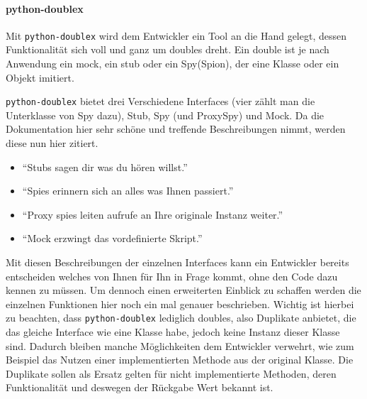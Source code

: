 \paragraph{python-doublex}\label{python-tools:doublex}\mbox{}
\newline
Mit \lstinline{python-doublex} wird dem Entwickler ein Tool an die Hand gelegt,
dessen Funktionalität sich voll und ganz um doubles dreht. Ein double ist je nach
Anwendung ein \Gls{mock}, ein \Gls{stub} oder ein Spy(Spion), der eine Klasse oder
ein Objekt imitiert.

\lstinline{python-doublex} bietet drei Verschiedene Interfaces (vier zählt man die
Unterklasse von Spy dazu), Stub, Spy (und ProxySpy) und Mock. Da die Dokumentation
hier sehr schöne und treffende Beschreibungen nimmt, werden diese nun hier zitiert.
\begin{itemize}
    \item "`Stubs sagen dir was du hören willst."' 
    \item "`Spies erinnern sich an alles was Ihnen passiert."' 
    \item "`Proxy spies leiten aufrufe an Ihre originale Instanz weiter."' 
    \item "`Mock erzwingt das vordefinierte Skript."' 
\end{itemize}

Mit diesen Beschreibungen der einzelnen Interfaces kann ein Entwickler bereits entscheiden
welches von Ihnen für Ihn in Frage kommt, ohne den Code dazu kennen zu müssen. Um dennoch
einen erweiterten Einblick zu schaffen werden die einzelnen Funktionen hier noch ein mal
genauer beschrieben. Wichtig ist hierbei zu beachten, dass \lstinline{python-doublex}
lediglich doubles, also Duplikate anbietet, die das gleiche Interface wie eine Klasse habe,
jedoch keine Instanz dieser Klasse sind. Dadurch bleiben manche Möglichkeiten dem
Entwickler verwehrt, wie zum Beispiel das Nutzen einer implementierten Methode aus
der original Klasse. Die Duplikate sollen als Ersatz gelten für nicht implementierte
Methoden, deren Funktionalität und deswegen der Rückgabe Wert bekannt ist.

